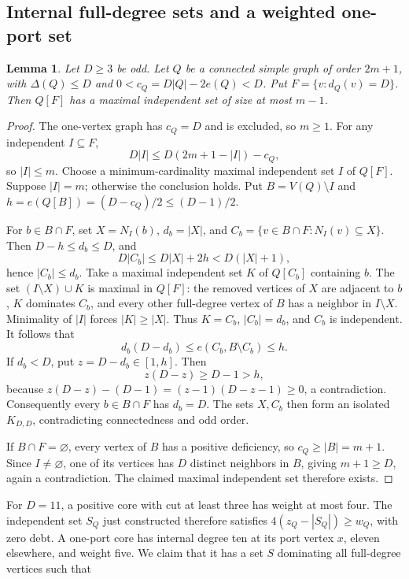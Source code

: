 \documentclass[11pt,a4paper]{article}
\newtheorem{lemma}[theorem]{Lemma}
\theoremstyle{definition}
\begin{document}
\subsection{Internal full-degree sets and a weighted one-port set}
\begin{lemma}\label{lem:odd-deficit-independent}
Let \(D\ge3\) be odd. Let \(Q\) be a connected simple graph of order \(2m+1\), with
\(\Delta(Q)\le D\) and \(0<c_Q=D|Q|-2e(Q)<D\).
Put \(F=\{v:d_Q(v)=D\}\).
Then \(Q[F]\) has a maximal independent set of size at most \(m-1\).

\end{lemma}\begin{proof}
The one-vertex graph has \(c_Q=D\) and is excluded, so \(m\ge1\).
For any independent \(I\subseteq F\),
\[
D|I|\le D(2m+1-|I|)-c_Q,
\]
so \(|I|\le m\).
Choose a minimum-cardinality maximal independent set \(I\) of \(Q[F]\).
Suppose \(|I|=m\); otherwise the conclusion holds.
Put \(B=V(Q)\setminus I\) and
\(h=e(Q[B])=(D-c_Q)/2\le(D-1)/2\).

For \(b\in B\cap F\), set \(X=N_I(b)\), \(d_b=|X|\), and
\(C_b=\{v\in B\cap F:N_I(v)\subseteq X\}\).
Then \(D-h\le d_b\le D\), and
\[
D|C_b|\le D|X|+2h<D(|X|+1),
\]
hence \(|C_b|\le d_b\).
Take a maximal independent set \(K\) of \(Q[C_b]\) containing \(b\).
The set \((I\setminus X)\cup K\) is maximal in \(Q[F]\):
the removed vertices of \(X\) are adjacent to \(b\), \(K\) dominates \(C_b\), and every other full-degree vertex of \(B\) has a neighbor in \(I\setminus X\).
Minimality of \(|I|\) forces \(|K|\ge|X|\).
Thus \(K=C_b\), \(|C_b|=d_b\), and \(C_b\) is independent.
It follows that
\[
d_b(D-d_b)\le e(C_b,B\setminus C_b)\le h.
\]
If \(d_b<D\), put \(z=D-d_b\in[1,h]\).
Then
\[
z(D-z)\ge D-1>h,
\]
because \(z(D-z)-(D-1)=(z-1)(D-z-1)\ge0\), a contradiction.
Consequently every \(b\in B\cap F\) has \(d_b=D\).
The sets \(X,C_b\) then form an isolated \(K_{D,D}\), contradicting connectedness and odd order.

If \(B\cap F=\varnothing\), every vertex of \(B\) has a positive deficiency, so
\(c_Q\ge|B|=m+1\). Since \(I\ne\varnothing\), one of its vertices has \(D\) distinct neighbors in \(B\), giving \(m+1\ge D\), again a contradiction.
The claimed maximal independent set therefore exists.
\end{proof}
For $D=11$, a positive core with cut at least three has weight at most four. The independent set $S_Q$ just constructed therefore satisfies
$4(z_Q-|S_Q|)\ge w_Q$, with zero debt.
A one-port core has internal degree ten at its port vertex $x$, eleven elsewhere, and weight five. We claim that it has a set $S$ dominating all full-degree vertices such that
\end{document}
